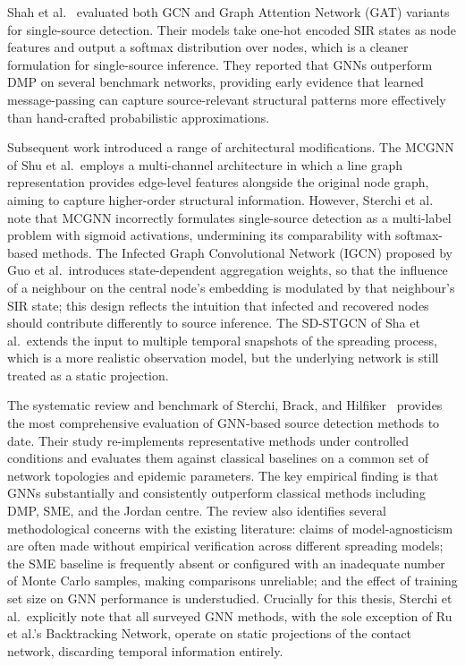 Shah et al.~\cite{Shah2020} evaluated both GCN and Graph Attention Network (GAT) variants for single-source detection. Their models take one-hot encoded SIR states as node features and output a softmax distribution over nodes, which is a cleaner formulation for single-source inference. They reported that GNNs outperform DMP on several benchmark networks, providing early evidence that learned message-passing can capture source-relevant structural patterns more effectively than hand-crafted probabilistic approximations.

Subsequent work introduced a range of architectural modifications. The MCGNN of Shu et al.\ employs a multi-channel architecture in which a line graph representation provides edge-level features alongside the original node graph, aiming to capture higher-order structural information. However, Sterchi et al.~\cite{Sterchi2025} note that MCGNN incorrectly formulates single-source detection as a multi-label problem with sigmoid activations, undermining its comparability with softmax-based methods. The Infected Graph Convolutional Network (IGCN) proposed by Guo et al.\ introduces state-dependent aggregation weights, so that the influence of a neighbour on the central node's embedding is modulated by that neighbour's SIR state; this design reflects the intuition that infected and recovered nodes should contribute differently to source inference. The SD-STGCN of Sha et al.\ extends the input to multiple temporal snapshots of the spreading process, which is a more realistic observation model, but the underlying network is still treated as a static projection.

The systematic review and benchmark of Sterchi, Brack, and Hilfiker~\cite{Sterchi2025} provides the most comprehensive evaluation of GNN-based source detection methods to date. Their study re-implements representative methods under controlled conditions and evaluates them against classical baselines on a common set of network topologies and epidemic parameters. The key empirical finding is that GNNs substantially and consistently outperform classical methods including DMP, SME, and the Jordan centre. The review also identifies several methodological concerns with the existing literature: claims of model-agnosticism are often made without empirical verification across different spreading models; the SME baseline is frequently absent or configured with an inadequate number of Monte Carlo samples, making comparisons unreliable; and the effect of training set size on GNN performance is understudied. Crucially for this thesis, Sterchi et al.\ explicitly note that all surveyed GNN methods, with the sole exception of Ru et al.'s Backtracking Network, operate on static projections of the contact network, discarding temporal information entirely.

